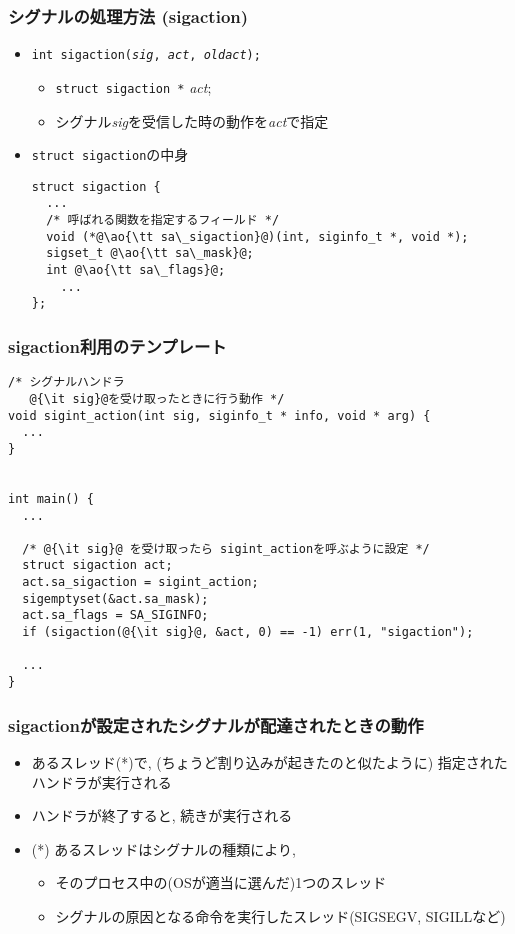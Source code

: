 \documentclass[12pt,dvipdfmx]{beamer}
\begin{document}
\begin{frame}[fragile]
  \frametitle{シグナルの処理方法 (sigaction)}
  \begin{itemize}
  \item {\tt int sigaction({\it sig}, {\it act}, {\it oldact});}
    \begin{itemize}
    \item {\tt struct sigaction *} {\it act};
    \item シグナル{\it sig}を受信した時の動作を{\it act}で指定
    \end{itemize}
  \item {\tt struct sigaction}の中身
\begin{lstlisting}
struct sigaction {
  ...
  /* 呼ばれる関数を指定するフィールド */
  void (*@\ao{\tt sa\_sigaction}@)(int, siginfo_t *, void *); 
  sigset_t @\ao{\tt sa\_mask}@;
  int @\ao{\tt sa\_flags}@;
    ...
};
\end{lstlisting}
  \end{itemize}
\end{frame}

\begin{frame}[fragile]
\frametitle{sigaction利用のテンプレート}
\begin{lstlisting}
/* シグナルハンドラ
   @{\it sig}@を受け取ったときに行う動作 */
void sigint_action(int sig, siginfo_t * info, void * arg) {
  ...
}


int main() { 
  ...

  /* @{\it sig}@ を受け取ったら sigint_actionを呼ぶように設定 */
  struct sigaction act;
  act.sa_sigaction = sigint_action;
  sigemptyset(&act.sa_mask);
  act.sa_flags = SA_SIGINFO;
  if (sigaction(@{\it sig}@, &act, 0) == -1) err(1, "sigaction");

  ...
}
\end{lstlisting}
\end{frame}

\begin{frame}
  \frametitle{sigactionが設定されたシグナルが配達されたときの動作}
  \begin{itemize}
  \item あるスレッド(*)で, (ちょうど割り込みが起きたのと似たように)
    指定されたハンドラが実行される
  \item ハンドラが終了すると, 続きが実行される
  \item (*) あるスレッドはシグナルの種類により,
    \begin{itemize}
    \item そのプロセス中の(OSが適当に選んだ)1つのスレッド
    \item シグナルの原因となる命令を実行したスレッド(SIGSEGV, SIGILLなど)
    \end{itemize}
  \end{itemize}
\end{frame}
\end{document}
